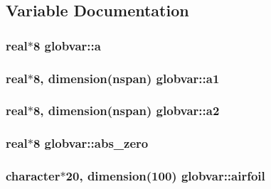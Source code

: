 \subsection{Variable Documentation}
\hypertarget{namespaceglobvar_a13851f46e6899d97ecaf2610a1d6f301}{}
\subsubsection[{a}]{\setlength{\rightskip}{0pt plus 5cm}real$\ast$8 globvar\+::a}\label{namespaceglobvar_a13851f46e6899d97ecaf2610a1d6f301}
\hypertarget{namespaceglobvar_a3597b44b373a600eb4d077e55967c69d}{}
\subsubsection[{a1}]{\setlength{\rightskip}{0pt plus 5cm}real$\ast$8, dimension({\bf nspan}) globvar\+::a1}\label{namespaceglobvar_a3597b44b373a600eb4d077e55967c69d}
\hypertarget{namespaceglobvar_a83f42557544a90cc620fc38150229baa}{}
\subsubsection[{a2}]{\setlength{\rightskip}{0pt plus 5cm}real$\ast$8, dimension({\bf nspan}) globvar\+::a2}\label{namespaceglobvar_a83f42557544a90cc620fc38150229baa}
\hypertarget{namespaceglobvar_a2ffa8ff8b7b664c43c8c171090806037}{}
\subsubsection[{abs\+\_\+zero}]{\setlength{\rightskip}{0pt plus 5cm}real$\ast$8 globvar\+::abs\+\_\+zero}\label{namespaceglobvar_a2ffa8ff8b7b664c43c8c171090806037}
\hypertarget{namespaceglobvar_ae69735f940091c76c32c20b4cd90ebb4}{}
\subsubsection[{airfoil}]{\setlength{\rightskip}{0pt plus 5cm}character$\ast$20, dimension(100) globvar\+::airfoil}\label{namespaceglobvar_ae69735f940091c76c32c20b4cd90ebb4}
\hypertarget{namespaceglobvar_ace5a9b2d41e77ec26c678a7755174bf2}{}
